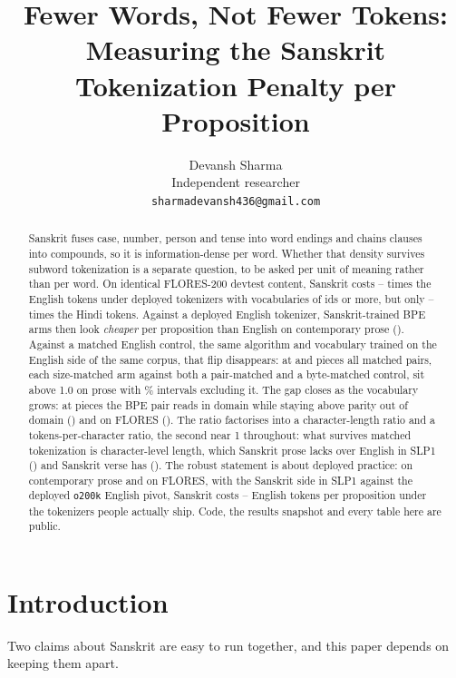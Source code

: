 \documentclass[11pt]{article}
\title{Fewer Words, Not Fewer Tokens: Measuring the Sanskrit Tokenization Penalty per
Proposition}
\author{Devansh Sharma \\
  Independent researcher \\
  \texttt{sharmadevansh436@gmail.com}}
\begin{document}
\maketitle

\begin{abstract}
Sanskrit fuses case, number, person and tense into word endings and chains clauses into
compounds, so it is information-dense per word. Whether that density survives subword
tokenization is a separate question, to be asked per unit of meaning rather than per word.
On identical FLORES-200 devtest content, Sanskrit costs
\numParitySaEnLo--\numParitySaEnHi{} times the English tokens under deployed
tokenizers with vocabularies of \numLargeVocabFloor{} ids or more, but only
\numParitySaHiLargeLo--\numParitySaHiLargeHi{} times the Hindi tokens. Against a deployed
English tokenizer, Sanskrit-trained BPE arms then look \emph{cheaper} per proposition than
English on contemporary prose (\numTppBpeSixtyFourDeployed). Against a matched English
control, the same algorithm and vocabulary trained on the English side of the same corpus,
that flip disappears: at \numVocabSmall{} and \numVocabLarge{} pieces all
\numControlledPairsSmall{} matched pairs, each size-matched arm against both a pair-matched
and a byte-matched control, sit above 1.0 on prose with \numCiLevel\%{} intervals
excluding it. The gap closes as
the vocabulary grows: at \numVocabHuge{} pieces the BPE pair reads
\numTppBpeHugeSamayik{} in domain while staying above parity out of domain
(\numTppBpeHugeOod) and on FLORES (\numTppBpeHugeFlores). The ratio factorises into a
character-length ratio and a tokens-per-character ratio, the second near 1 throughout: what
survives matched tokenization is character-level length, which Sanskrit
prose lacks over English in SLP1 (\numCharRatioSamayik) and Sanskrit verse has
(\numCharRatioItihasa). The robust statement is about deployed practice: on
contemporary prose and on FLORES, with the Sanskrit side in SLP1 against the deployed
\texttt{o200k} English pivot, Sanskrit costs \numDeployedLo--\numDeployedHi{} English
tokens per proposition under the tokenizers people actually ship. Code, the results
snapshot and every table here are public.
\end{abstract}

\section{Introduction}
\label{sec:intro}

Two claims about Sanskrit are easy to run together, and this paper depends on keeping
them apart.
\end{document}
